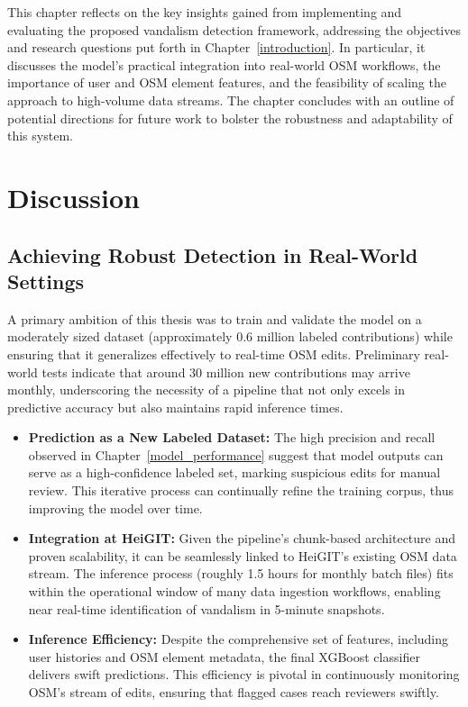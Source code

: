 \documentclass[
    13pt, %
    a4paper, %
    DIV14, %
    listof=totoc, %
    bibliography=totoc, %
    index=totoc, %
    headsepline
]{scrreprt}
\begin{document}
This chapter reflects on the key insights gained from implementing and evaluating the proposed vandalism detection framework, addressing the objectives and research questions put forth in Chapter~\ref{introduction}. In particular, it discusses the model’s practical integration into real-world OSM workflows, the importance of user and OSM element features, and the feasibility of scaling the approach to high-volume data streams. The chapter concludes with an outline of potential directions for future work to bolster the robustness and adaptability of this system.

\section{Discussion}
\label{sec:discussion}

\subsection{Achieving Robust Detection in Real-World Settings}
A primary ambition of this thesis was to train and validate the model on a moderately sized dataset (approximately 0.6 million labeled contributions) while ensuring that it generalizes effectively to real-time OSM edits. Preliminary real-world tests indicate that around 30 million new contributions may arrive monthly, underscoring the necessity of a pipeline that not only excels in predictive accuracy but also maintains rapid inference times.
\begin{itemize}
    \item \textbf{Prediction as a New Labeled Dataset:} The high precision and recall observed in Chapter~\ref{model_performance} suggest that model outputs can serve as a high-confidence labeled set, marking suspicious edits for manual review. This iterative process can continually refine the training corpus, thus improving the model over time.
    \item \textbf{Integration at HeiGIT:} Given the pipeline’s chunk-based architecture and proven scalability, it can be seamlessly linked to HeiGIT’s existing OSM data stream. The inference process (roughly 1.5 hours for monthly batch files) fits within the operational window of many data ingestion workflows, enabling near real-time identification of vandalism in 5-minute snapshots.
    \item \textbf{Inference Efficiency:} Despite the comprehensive set of features, including user histories and OSM element metadata, the final XGBoost classifier delivers swift predictions. This efficiency is pivotal in continuously monitoring OSM’s stream of edits, ensuring that flagged cases reach reviewers swiftly.
\end{itemize}
\end{document}
